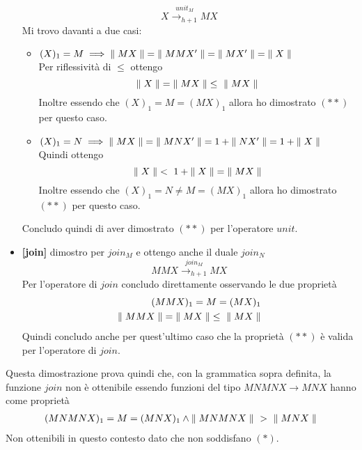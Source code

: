\begin{itemize}
        \begin{equation*}X \overset{unit_M}{\longrightarrow_{h+1}} MX\end{equation*}
        Mi trovo davanti a due casi:
        \begin{itemize}
          \item $(X)_1 = M \implies {\parallel MX\parallel} = {\parallel MMX'\parallel} = {\parallel MX'\parallel} = {\parallel X\parallel}$\\
            Per riflessività di $\leq$ ottengo
            \begin{equation*}\req{X} = \req{MX} \leq\ \req{MX}\end{equation*}
            Inoltre essendo che $(X)_1 = M = (MX)_1$ allora ho dimostrato $(**)$
            per questo caso.
          \item  $(X)_1 = N \implies {\parallel MX\parallel} = {\parallel MNX'\parallel} = 1 + {\parallel NX'\parallel} = 1 + {\parallel X\parallel}$\\
            Quindi ottengo
            \begin{equation*}{\parallel X\parallel} <\ 1 + {\parallel X\parallel} = {\parallel MX\parallel}\end{equation*}
            Inoltre essendo che $(X)_1 = N \neq M = (MX)_1$ allora ho dimostrato $(**)$
            per questo caso.
        \end{itemize}
        Concludo quindi di aver dimostrato $(**)$ per l'operatore $unit$.
      \item \textbf{[join]} dimostro per $join_M$ e ottengo anche il duale $join_N$
        \begin{equation*}MMX \overset{join_M}{\longrightarrow_{h+1}} MX\end{equation*}
        Per l'operatore di $join$ concludo direttamente osservando le due proprietà
        \begin{align*}
          (MMX)_1 = M = (MX)_1\\
          {\parallel MMX\parallel} = {\parallel MX\parallel} \leq\ {\parallel MX\parallel}
        \end{align*}
        Quindi concludo anche per quest'ultimo caso che la proprietà $(**)$ è valida
        per l'operatore di $join$.
\end{itemize}

Questa dimostrazione prova quindi che, con la grammatica sopra definita,
la funzione $join$ non è ottenibile essendo funzioni del tipo $MNMNX \to MNX$
hanno come proprietà
\begin{align*}
  (MNMNX)_1 = M = (MNX)_1 \land
  {\parallel MNMNX\parallel}\ >\ {\parallel MNX\parallel}
\end{align*}
Non ottenibili in questo contesto dato che non soddisfano $(*)$.\newline


